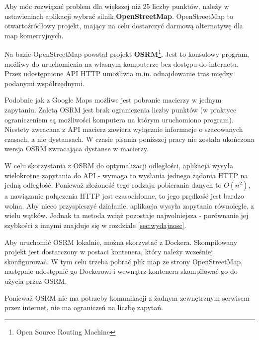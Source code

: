 Aby móc rozwiązać problem dla większej niż 25 liczby punktów, należy w ustawieniach aplikacji wybrać silnik \textbf{OpenStreetMap}. OpenStreetMap to otwartoźródłowy projekt, mający na celu dostarczyć darmową alternatywę dla map komercyjnych.

Na bazie OpenStreetMap powstał projekt \textbf{OSRM}\footnote{Open Source Routing Machine}. Jest to konsolowy program, możliwy do uruchomienia na własnym komputerze bez dostępu do internetu. Przez udostępnione API HTTP umożliwia m.in. odnajdowanie tras między podanymi współrzędnymi.

Podobnie jak z Google Maps możliwe jest pobranie macierzy w jednym zapytaniu. Zaletą OSRM jest brak ograniczenia liczby punktów (w praktyce ograniczeniem są możliwości komputera na którym uruchomiono program). Niestety zwracana z API macierz zawiera wyłącznie informacje o szacowanych czasach, a nie dystansach. W czasie pisania poniższej pracy nie została ukończona wersja OSRM zwracająca dystanse w macierzy.

W celu skorzystania z OSRM do optymalizacji odległości, aplikacja wysyła wielokrotne zapytania do API - wymaga to wysłania jednego żądania HTTP na jedną odległość. Ponieważ złożoność tego rodzaju pobierania danych to $O(n^{2})$, a nawiązanie połączenia HTTP jest czasochłonne, to jego prędkość jest bardzo wolna. Aby nieco przyspieszyć działanie, aplikacja wysyła zapytania równolegle, z wielu wątków. Jednak ta metoda wciąż pozostaje najwolniejsza - porównanie jej szybkości z innymi znajduje się w rozdziale \ref{sec:wydajnosc}.

Aby uruchomić OSRM lokalnie, można skorzystać z Dockera. Skompilowany projekt jest dostarczony w postaci kontenera, który należy wcześniej skonfigurować. W tym celu trzeba pobrać plik map ze strony OpenStreetMap, następnie udostępnić go Dockerowi i wewnątrz kontenera skompilować go do użycia przez OSRM.

Ponieważ OSRM nie ma potrzeby komunikacji z żadnym zewnętrznym serwisem przez internet, nie ma ograniczeń na liczbę zapytań.